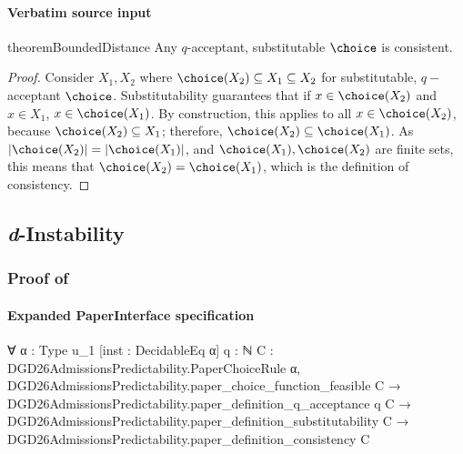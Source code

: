 \documentclass[10pt]{article}
\begin{document}
\paragraph{Verbatim source input}
\begin{ReviewVerbatim}
\begin{restatable}{theorem}{BoundedDistance}
\label{thm:sub-accept-consistent}
Any $q$-acceptant, substitutable $\choice$ is consistent.
\end{restatable}

\begin{proof}
Consider $X_1, X_2$ where $\choice(X_2) \subseteq X_1 \subseteq X_2$ for substitutable, $q-$acceptant $\choice$. Substitutability guarantees that if $x \in \choice(X_2)$ and $x \in X_1$, $x \in \choice(X_1)$. By construction, this applies to all $x \in \choice(X_2)$, because $\choice(X_2) \subseteq X_1$; therefore, $\choice(X_2) \subseteq \choice(X_1)$. As $|\choice(X_2)| = |\choice(X_1)|$, and $\choice(X_1),\choice(X_2)$ are finite sets, this means that $\choice(X_2) = \choice(X_1)$, which is the definition of consistency.
\end{proof}

\subsection{\textit{d}-Instability} \label{sec:d-unstable-appendix}

\subsubsection{Proof of } \label{sec:calc-proof}
\end{ReviewVerbatim}



\paragraph{Expanded PaperInterface specification}
\begin{ReviewVerbatim}
∀ {α : Type u_1} [inst : DecidableEq α] {q : ℕ} {C : DGD26AdmissionsPredictability.PaperChoiceRule α},
  DGD26AdmissionsPredictability.paper_choice_function_feasible C →
    DGD26AdmissionsPredictability.paper_definition_q_acceptance q C →
      DGD26AdmissionsPredictability.paper_definition_substitutability C →
        DGD26AdmissionsPredictability.paper_definition_consistency C
\end{ReviewVerbatim}
\end{document}

